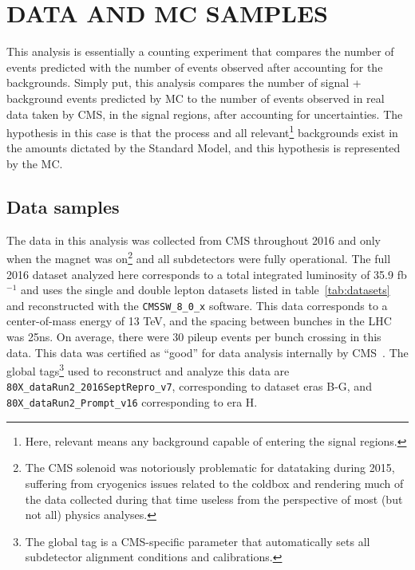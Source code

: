 %
%

\chapter{DATA AND MC SAMPLES}
This analysis is essentially a counting experiment that compares the number of \tth events predicted with the number of events observed after accounting for the backgrounds.
Simply put, this analysis compares the number of signal + background events predicted by MC to the number of events observed in real data taken by CMS, in the signal regions, after accounting for uncertainties. 
The hypothesis in this case is that the \tth process and all relevant\footnote{Here, relevant means any background capable of entering the signal regions.} backgrounds exist in the amounts dictated by
the Standard Model, and this hypothesis is represented by the MC. 

\section{Data samples}
The data in this analysis was collected from CMS throughout 2016 and only when the magnet was on\footnote{The CMS solenoid was notoriously problematic for datataking during 2015,
suffering from cryogenics issues related to the coldbox and rendering much of the data collected during that time useless from the perspective of most (but not all) physics analyses.}
and all subdetectors were fully operational.
The full 2016 dataset analyzed here corresponds to a total integrated luminosity of 35.9 fb$^{-1}$ and uses the single and double lepton datasets listed in table~\ref{tab:datasets}
and reconstructed with the \texttt{CMSSW\_8\_0\_x} software. This data corresponds to a center-of-mass energy of 13 TeV, and the spacing between bunches in the LHC was 25ns.
On average, there were 30 pileup events per bunch crossing in this data. This data was certified as ``good'' for data analysis internally by CMS~\cite{json}.
The global tags\footnote{The global tag is a CMS-specific parameter that automatically sets all subdetector alignment conditions and calibrations.} used to reconstruct and analyze this data are
\texttt{80X\_dataRun2\_2016SeptRepro\_v7}, corresponding to dataset eras B-G, and \texttt{80X\_dataRun2\_Prompt\_v16} corresponding to era H.

